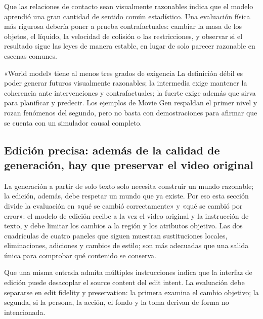 Que las relaciones de contacto sean visualmente razonables indica que el modelo aprendió una gran cantidad de sentido común estadístico. Una evaluación física más rigurosa debería poner a prueba contrafactuales: cambiar la masa de los objetos, el líquido, la velocidad de colisión o las restricciones, y observar si el resultado sigue las leyes de manera estable, en lugar de solo parecer razonable en escenas comunes.

\begin{warningbox}{«World model» tiene al menos tres grados de exigencia}
La definición débil es poder generar futuros visualmente razonables; la intermedia exige mantener la coherencia ante intervenciones y contrafactuales; la fuerte exige además que sirva para planificar y predecir. Los ejemplos de Movie Gen respaldan el primer nivel y rozan fenómenos del segundo, pero no basta con demostraciones para afirmar que se cuenta con un simulador causal completo.
\end{warningbox}


\subsection{Edición precisa: además de la calidad de generación, hay que preservar el video original}

La generación a partir de solo texto solo necesita construir un mundo razonable; la edición, además, debe respetar un mundo que ya existe. Por eso esta sección divide la evaluación en «qué se cambió correctamente» y «qué se cambió por error»: el modelo de edición recibe a la vez el video original y la instrucción de texto, y debe limitar los cambios a la región y los atributos objetivo. Las dos cuadrículas de cuatro paneles que siguen muestran sustituciones locales, eliminaciones, adiciones y cambios de estilo; son más adecuadas que una salida única para comprobar qué contenido se conserva.


Que una misma entrada admita múltiples instrucciones indica que la interfaz de edición puede desacoplar el source content del edit intent. La evaluación debe separarse en edit fidelity y preservation: la primera examina el cambio objetivo; la segunda, si la persona, la acción, el fondo y la toma derivan de forma no intencionada.

